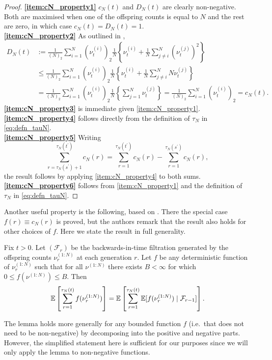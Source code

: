 \begin{proof}
\textbf{\ref{item:cN_property1}}  $c_N(t)$ and $D_N(t)$ are clearly non-negative. Both are maximised when one of the offspring counts is equal to $N$ and the rest are zero, in which case $c_N(t) = D_N(t) = 1$.\\
\textbf{\ref{item:cN_property2}} As outlined in \textcite[p.9]{koskela2018},
\begin{align*}
D_N(t) &:= \frac{1}{(N)_2} \sum_{i=1}^N (\nu_t^{(i)})_2 \frac{1}{N} \left\{  \nu_t^{(i)} + \frac{1}{N} \sum_{j\neq i}^N (\nu_t^{(j)})^2 \right\} \\
&\leq \frac{1}{(N)_2} \sum_{i=1}^N (\nu_t^{(i)})_2 \frac{1}{N} \left\{  \nu_t^{(i)} + \frac{1}{N} \sum_{j\neq i}^N N \nu_t^{(j)} \right\} \\
&= \frac{1}{(N)_2} \sum_{i=1}^N (\nu_t^{(i)})_2 \frac{1}{N} \left\{ \sum_{j =1}^N \nu_t^{(j)} \right\}
= \frac{1}{(N)_2} \sum_{i=1}^N (\nu_t^{(i)})_2
= c_N(t) .
\end{align*}
\textbf{\ref{item:cN_property3}} is immediate given \ref{item:cN_property1}.\\
\textbf{\ref{item:cN_property4}} follows directly from the definition of $\tau_N$ in \eqref{eq:defn_tauN}.\\
\textbf{\ref{item:cN_property5}} Writing
\begin{equation*}
\sum_{r=\tau_N(s^\prime)+1}^{\tau_N(t^\prime)} c_N(r)
= \sum_{r=1}^{\tau_N(t^\prime)} c_N(r) 
        - \sum_{r=1}^{\tau_N(s^\prime)} c_N(r) ,
\end{equation*}
the result follows by applying \ref{item:cN_property4} to both sums.\\
\textbf{\ref{item:cN_property6}} follows from \ref{item:cN_property1} and the definition of $\tau_N$ in \eqref{eq:defn_tauN}.
\end{proof}


Another useful property is the following, based on \textcite[Lemma 2]{koskela2018}. There the special case $f(r) \equiv c_N(r)$ is proved, but the authors remark that the result also holds for other choices of $f$. Here we state the result in full generality.

\begin{lemma}\label{thm:kjjslemma2}
Fix $t>0$.
Let $(\mathcal{F}_r)$ be the backwards-in-time filtration generated by the offspring counts $\nu_r^{(1:N)}$ at each generation $r$.
Let $f$ be any deterministic function of $\nu_r^{(1:N)}$ such that for all $\nu^{(1:N)}$ there exists $B<\infty$ for which $0\leq f(\nu^{(1:N)}) \leq B$.
Then
\begin{equation*}
\mathbb{E} \left[ \sum_{r=1}^{\tau_N(t)} f(\nu_r^{(1:N)}) \right] 
= \mathbb{E} \left[ \sum_{r=1}^{\tau_N(t)} \mathbb{E} [ f(\nu_r^{(1:N)}) \mid \mathcal{F}_{r-1} ] \right] .
\end{equation*}
\end{lemma}
The lemma holds more generally for any bounded function $f$ (i.e.\ that does not need to be non-negative) by decomposing into the positive and negative parts. However, the simplified statement here is sufficient for our purposes since we will only apply the lemma to non-negative functions.

